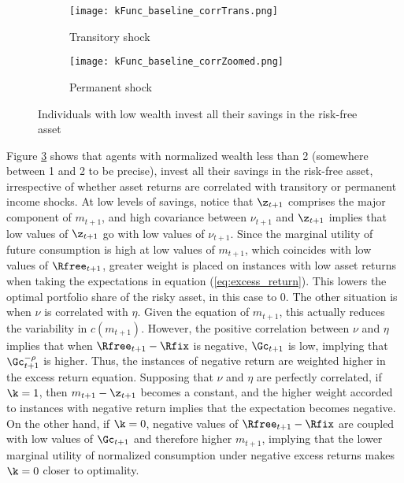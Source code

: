 \begin{figure}[h]
    \centering
    \begin{subfigure}{0.49\textwidth}
        \centering
        \texttt{[image: kFunc\_baseline\_corrTrans.png]}
        \caption{Transitory shock}
        \label{subfig:correlated_poor_transitory}        
    \end{subfigure}
    \begin{subfigure}{0.49\textwidth}
        \centering
        \texttt{[image: kFunc\_baseline\_corrZoomed.png]}
        \caption{Permanent shock}
        \label{subfig:correlated_poor_permanent}
    \end{subfigure}
    \caption{Individuals with low wealth invest all their savings in the risk-free asset}
    \label{fig:baseline_correlated_poor}
\end{figure}

Figure \ref{fig:baseline_correlated_poor} shows that agents with normalized wealth less than 2 (somewhere between 1 and 2 to be precise), invest all their savings in the risk-free asset, irrespective of whether asset returns are correlated with transitory or permanent income shocks. At low levels of savings, notice that $\z_{t+1}$ comprises the major component of $m_{t+1}$, and high covariance between $\nu_{t+1}$ and $\z_{t+1}$ implies that low values of $\z_{t+1}$ go with low values of $\nu_{t+1}$. Since the marginal utility of future consumption is high at low values of $m_{t+1}$, which coincides with low values of $\Rfree_{t+1}$, greater weight is placed on instances with low asset returns when taking the expectations in equation (\ref{eq:excess_return}). This lowers the optimal portfolio share of the risky asset, in this case to 0. The other situation is when $\nu$ is correlated with $\eta$. Given the equation of $m_{t+1}$, this actually reduces the variability in $c(m_{t+1})$. However, the positive correlation between $\nu$ and $\eta$ implies that when $\Rfree_{t+1} - \Rfix$ is negative, $\Gc_{t+1}$ is low, implying that $\Gc_{t+1}^{-\rho}$ is higher. Thus, the instances of negative return are weighted higher in the excess return equation. Supposing that $\nu$ and $\eta$ are perfectly correlated, if $\k = 1$, then $m_{t+1} - \z_{t+1}$ becomes a constant, and the higher weight accorded to instances with negative return implies that the expectation becomes negative. On the other hand, if $\k = 0$, negative values of $\Rfree_{t+1} - \Rfix$ are coupled with low values of $\Gc_{t+1}$ and therefore higher $m_{t+1}$, implying that the lower marginal utility of normalized consumption under negative excess returns makes $\k = 0$ closer to optimality.

